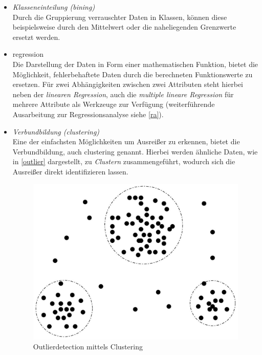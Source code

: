 \begin{itemize}

\item \textit{Klasseneinteilung (bining)}
\\ Durch die Gruppierung verrauschter Daten in Klassen, können diese beispielsweise durch den Mittelwert oder die naheliegenden Grenzwerte ersetzt werden. 

\item \gls{regression}
\\ Die Darstellung der Daten in Form einer mathematischen Funktion, bietet die Möglichkeit, fehlerbehaftete Daten  durch die berechneten Funktionswerte zu ersetzen. Für zwei Abhängigkeiten zwischen zwei Attributen steht hierbei neben der \textit{linearen Regression}, auch die \textit{multiple lineare Regression} für mehrere Attribute als Werkzeuge zur Verfügung (weiterführende Ausarbeitung zur Regressionsanalyse siehe \vref{ra}). 

\item \textit{Verbundbildung (clustering)}
\\ Eine der einfachsten Möglichkeiten um Ausreißer zu erkennen, bietet die Verbundbildung, auch \gls{clustering} genannt. Hierbei werden ähnliche Daten, wie in \vref{outlier} dargestellt, zu \textit{Clustern} zusammengeführt, wodurch sich die Ausreißer direkt identifizieren lassen.

\begin{figure}[H]
\centering
\includegraphics[scale=1.2]{se-wa-jpg/outlier}
\caption[Outlierdetection mittels Clustering]{Outlierdetection mittels Clustering\protect\footnotemark}
\label{outlier}
\end{figure}
\end{itemize}

